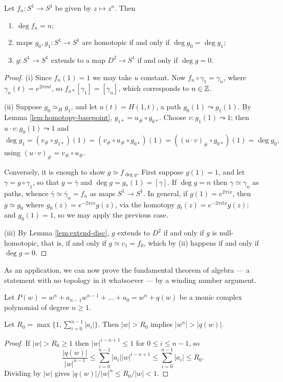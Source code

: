\documentclass[a4paper]{scrartcl}
\begin{document}
\begin{proposition} \label{prop:degree}
	Let $f_n: S^1 \to S^1$ be given by $z \mapsto z^n$. Then
	\begin{enumerate}
		\item $\deg f_n = n$;
		\item maps $g_0, g_1: S^1 \to S^1$ are homotopic if and only if $\deg g_0 = \deg g_1$;
		\item $g: S^1 \to S^1$ extends to a map $D^2 \to S^1$ if and only if $\deg g = 0$.
	\end{enumerate}
\end{proposition}
\begin{proof}
	(i) Since $f_n(1) = 1$ we may take $u$ constant. Now $f_n \circ \gamma_1 = \gamma_n$, where $\gamma_n(t) = e^{2\pi int}$, so $f_{n*}[\gamma_1] = [\gamma_n]$, which corresponds to $n \in \mathbb{Z}$.

	(ii) Suppose $g_0 \simeq_H g_1$, and let $u(t) = H(1,t)$, a path $g_0(1) \leadsto g_1(1)$. By Lemma \ref{lem:homotopy-basepoint}, $g_{1*} = u_\# \circ g_{0*}$. Choose $v: g_1(1) \leadsto 1$; then $u \cdot v : g_0(1) \leadsto 1$ and
	$$
	\deg g_1 = (v_\# \circ g_{1*})(1) = (v_\# \circ u_\# \circ g_{0*})(1) = ((u\cdot v)_\# \circ g_{0*})(1) = \deg g_0,
	$$
	using $(u \cdot v)_\# = v_\# \circ u_\#$.

	Conversely, it is enough to show $g \simeq f_{\deg g}$. First suppose $g(1) = 1$, and let $\gamma = g \circ \gamma_1$, so that $g = \bar\gamma$ and $\deg g = g_*(1) = [\gamma]$. If $\deg g = n$ then $\gamma \simeq \gamma_n$ as paths, whence $\bar\gamma \simeq \bar\gamma_n = f_n$ as maps $S^1 \to S^1$. In general, if $g(1) = e^{2\pi i x}$, then $g \simeq g_0$ where $g_0(z) = e^{-2\pi i x}g(z)$, via the homotopy $g_t(z) = e^{-2\pi i tx}g(z)$; and $g_0(1) = 1$, so we may apply the previous case.

	(iii) By Lemma \ref{lem:extend-disc}, $g$ extends to $D^2$ if and only if $g$ is null-homotopic, that is, if and only if $g \simeq c_{1} = f_0$, which by (ii) happens if and only if $\deg g = 0$.
\end{proof}

As an application, we can now prove the fundamental theorem of algebra --- a statement
with no topology in it whatsoever --- by a winding number argument.

Let $P(w) = w^n + a_{n-1}w^{n-1} + \dots + a_0 = w^n + q(w)$ be a monic complex polynomial
of degree $n \geq 1$.

\begin{lemma} \label{lem:fta-bound}
	Let $R_0 = \max\{1, \sum_{i=0}^{n-1}|a_i|\}$. Then $|w| > R_0$ implies $|w^n| > |q(w)|$.
\end{lemma}
\begin{proof}
	If $|w| > R_0 \geq 1$ then $|w|^{i - n + 1} \leq 1$ for $0 \leq i \leq n-1$, so
	$$
	\frac{|q(w)|}{|w|^{n-1}} \leq \sum_{i=0}^{n-1} |a_i| |w|^{i-n+1} \leq \sum_{i=0}^{n-1}|a_i| \leq R_0.
	$$
	Dividing by $|w|$ gives $|q(w)|/|w|^n \leq R_0/|w| < 1$.
\end{proof}
\end{document}
